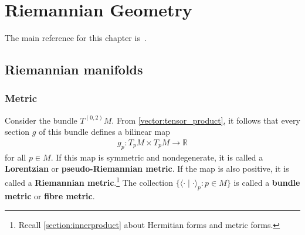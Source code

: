 \chapter{Riemannian Geometry}\label{chapter:riemann}

    The main reference for this chapter is~\citet{petersen_riemannian_2006}.

    \minitoc

\section{Riemannian manifolds}
\subsection{Metric}

    \begin{definition}
        Consider the bundle $T^{(0,2)}M$. From \cref{vector:tensor_product}, it follows that every section $g$ of this bundle defines a bilinear map
        \begin{gather}
            g_p:T_pM\times T_pM\rightarrow\mathbb{R}
        \end{gather}
        for all $p\in M$. If this map is symmetric and nondegenerate, it is called a \textbf{Lorentzian} or \textbf{pseudo-Riemannian metric}. If the map is also positive, it is called a \textbf{Riemannian metric}.\footnote{Recall \cref{section:innerproduct} about Hermitian forms and metric forms.} The collection $\{\langle\cdot\mid\cdot\rangle_p:p\in M\}$ is called a \textbf{bundle metric} or \textbf{fibre metric}.
    \end{definition}

